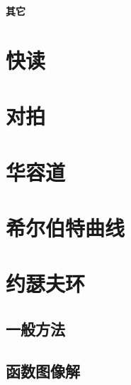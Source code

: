 \documentclass{article}
\begin{document}
\begin{titlepage}

\thispagestyle{empty}
\pagebreak
\textbf{其它}
\pagestyle{plain}
\tableofcontents



\hspace{3em}
\section{﻿快读}

%
\section{对拍}

\section{华容道}

\section{希尔伯特曲线}
\begin{figure}[htb] 
 \end{figure}

\section{约瑟夫环}
\subsection{一般方法}

\subsection{函数图像解}


\end{titlepage}
\end{document}
